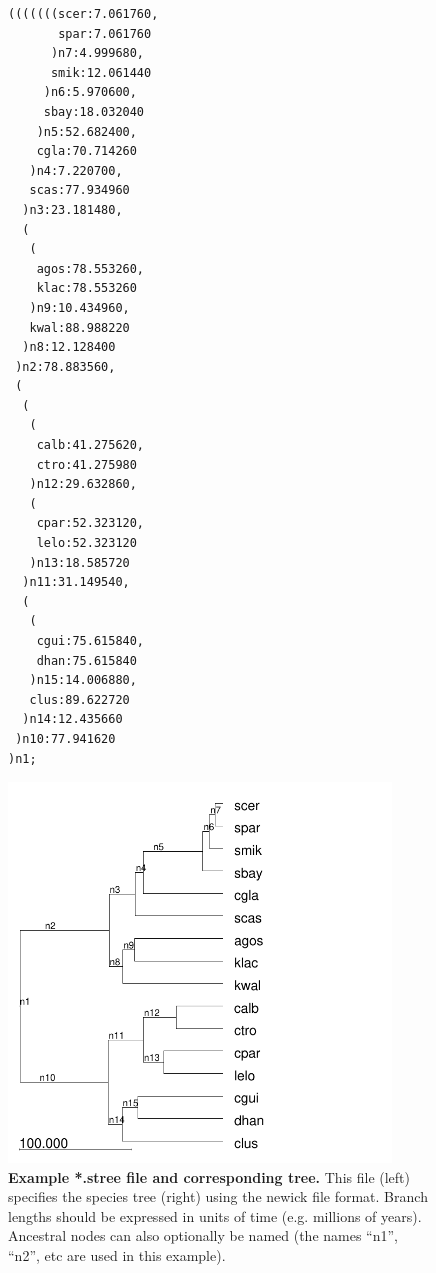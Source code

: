 \documentclass[11pt]{article}
\begin{document}
\begin{figure}
\begin{center}

\begin{minipage}{2in}
\tiny
\begin{lstlisting}[frame=tblr]
(((((((scer:7.061760,
       spar:7.061760
      )n7:4.999680,
      smik:12.061440
     )n6:5.970600,
     sbay:18.032040
    )n5:52.682400,
    cgla:70.714260
   )n4:7.220700,
   scas:77.934960
  )n3:23.181480,
  (
   (
    agos:78.553260,
    klac:78.553260
   )n9:10.434960,
   kwal:88.988220
  )n8:12.128400
 )n2:78.883560,
 (
  (
   (
    calb:41.275620,
    ctro:41.275980
   )n12:29.632860,
   (
    cpar:52.323120,
    lelo:52.323120
   )n13:18.585720
  )n11:31.149540,
  (
   (
    cgui:75.615840,
    dhan:75.615840
   )n15:14.006880,
   clus:89.622720
  )n14:12.435660
 )n10:77.941620
)n1;
\end{lstlisting}
\end{minipage} \hfill \begin{minipage}{4in}
\hspace{.5in}
\includegraphics[width=4in]{figures/fungi-stree.pdf}
\end{minipage}


\end{center}

\caption{{\bf Example *.stree file and corresponding tree.} This file
(left) specifies the species tree (right) using the newick file
format.  Branch lengths should be expressed in units of time
(e.g. millions of years).  Ancestral nodes can also optionally be
named (the names ``n1'', ``n2'', etc are used in this example).}
\label{fig:stree}
\end{figure}
\end{document}
